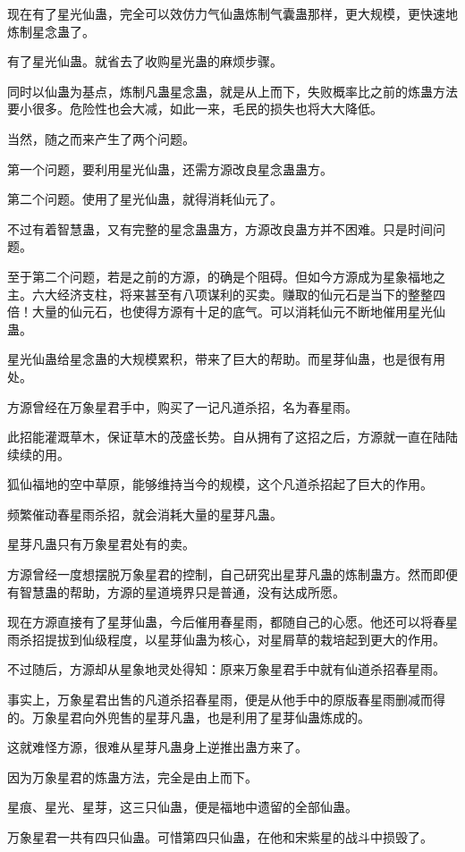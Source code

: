 \begin{this_body}
现在有了星光仙蛊，完全可以效仿力气仙蛊炼制气囊蛊那样，更大规模，更快速地炼制星念蛊了。

有了星光仙蛊。就省去了收购星光蛊的麻烦步骤。

同时以仙蛊为基点，炼制凡蛊星念蛊，就是从上而下，失败概率比之前的炼蛊方法要小很多。危险性也会大减，如此一来，毛民的损失也将大大降低。

当然，随之而来产生了两个问题。

第一个问题，要利用星光仙蛊，还需方源改良星念蛊蛊方。

第二个问题。使用了星光仙蛊，就得消耗仙元了。

不过有着智慧蛊，又有完整的星念蛊蛊方，方源改良蛊方并不困难。只是时间问题。

至于第二个问题，若是之前的方源，的确是个阻碍。但如今方源成为星象福地之主。六大经济支柱，将来甚至有八项谋利的买卖。赚取的仙元石是当下的整整四倍！大量的仙元石，也使得方源有十足的底气。可以消耗仙元不断地催用星光仙蛊。

星光仙蛊给星念蛊的大规模累积，带来了巨大的帮助。而星芽仙蛊，也是很有用处。

方源曾经在万象星君手中，购买了一记凡道杀招，名为春星雨。

此招能灌溉草木，保证草木的茂盛长势。自从拥有了这招之后，方源就一直在陆陆续续的用。

狐仙福地的空中草原，能够维持当今的规模，这个凡道杀招起了巨大的作用。

频繁催动春星雨杀招，就会消耗大量的星芽凡蛊。

星芽凡蛊只有万象星君处有的卖。

方源曾经一度想摆脱万象星君的控制，自己研究出星芽凡蛊的炼制蛊方。然而即便有智慧蛊的帮助，方源的星道境界只是普通，没有达成所愿。

现在方源直接有了星芽仙蛊，今后催用春星雨，都随自己的心愿。他还可以将春星雨杀招提拔到仙级程度，以星芽仙蛊为核心，对星屑草的栽培起到更大的作用。

不过随后，方源却从星象地灵处得知：原来万象星君手中就有仙道杀招春星雨。

事实上，万象星君出售的凡道杀招春星雨，便是从他手中的原版春星雨删减而得的。万象星君向外兜售的星芽凡蛊，也是利用了星芽仙蛊炼成的。

这就难怪方源，很难从星芽凡蛊身上逆推出蛊方来了。

因为万象星君的炼蛊方法，完全是由上而下。

星痕、星光、星芽，这三只仙蛊，便是福地中遗留的全部仙蛊。

万象星君一共有四只仙蛊。可惜第四只仙蛊，在他和宋紫星的战斗中损毁了。


\end{this_body}
